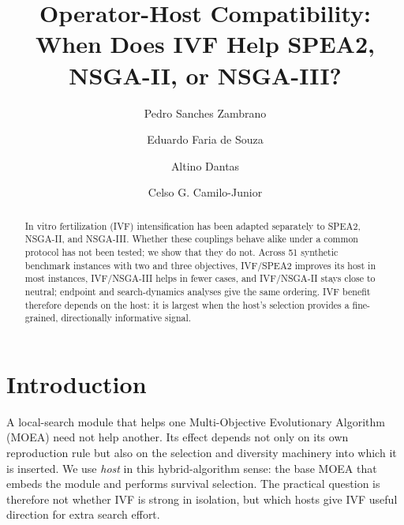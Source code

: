 \documentclass[runningheads]{llncs}
\begin{document}
\title{Operator-Host Compatibility:\\
When Does IVF Help SPEA2, NSGA-II, or NSGA-III?}


\author{Pedro Sanches Zambrano \and
Eduardo Faria de Souza \and
Altino Dantas \and
Celso G. Camilo-Junior}



\maketitle

\begin{abstract}
In vitro fertilization (IVF) intensification has been adapted separately to SPEA2, NSGA-II, and NSGA-III. Whether these couplings behave alike under a common protocol has not been tested; we show that they do not. Across 51 synthetic benchmark instances with two and three objectives, IVF/SPEA2 improves its host in most instances, IVF/NSGA-III helps in fewer cases, and IVF/NSGA-II stays close to neutral; endpoint and search-dynamics analyses give the same ordering. IVF benefit therefore depends on the host: it is largest when the host's selection provides a fine-grained, directionally informative signal.

\end{abstract}

\section{Introduction}
\label{sec:intro}

A local-search module that helps one Multi-Objective Evolutionary Algorithm (MOEA) need not help another. Its effect depends not only on its own reproduction rule but also on the selection and diversity machinery into which it is inserted. We use \emph{host} in this hybrid-algorithm sense: the base MOEA that embeds the module and performs survival selection. The practical question is therefore not whether IVF is strong in isolation, but which hosts give IVF useful direction for extra search effort.
\end{document}
